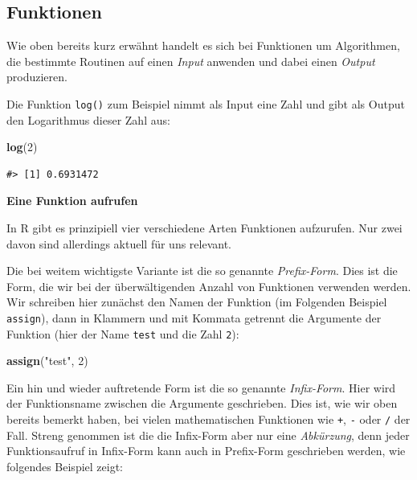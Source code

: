 \documentclass[]{tufte-book}
\newenvironment{Shaded}{}{}
\newcommand{\KeywordTok}[1]{\textcolor[rgb]{0.00,0.44,0.13}{\textbf{#1}}}
\newcommand{\DecValTok}[1]{\textcolor[rgb]{0.25,0.63,0.44}{#1}}
\newcommand{\StringTok}[1]{\textcolor[rgb]{0.25,0.44,0.63}{#1}}
\newcommand{\NormalTok}[1]{#1}
\begin{document}
\subsection{Funktionen}\label{funktionen}

Wie oben bereits kurz erwähnt handelt es sich bei Funktionen um
Algorithmen, die bestimmte Routinen auf einen \emph{Input} anwenden und
dabei einen \emph{Output} produzieren.

Die Funktion \texttt{log()} zum Beispiel nimmt als Input eine Zahl und
gibt als Output den Logarithmus dieser Zahl aus:

\begin{Shaded}
\begin{Highlighting}[]
\KeywordTok{log}\NormalTok{(}\DecValTok{2}\NormalTok{)}
\end{Highlighting}
\end{Shaded}

\begin{verbatim}
#> [1] 0.6931472
\end{verbatim}

\textbf{Eine Funktion aufrufen}

In R gibt es prinzipiell vier verschiedene Arten Funktionen aufzurufen.
Nur zwei davon sind allerdings aktuell für uns relevant.

Die bei weitem wichtigste Variante ist die so genannte
\emph{Prefix-Form}. Dies ist die Form, die wir bei der überwältigenden
Anzahl von Funktionen verwenden werden. Wir schreiben hier zunächst den
Namen der Funktion (im Folgenden Beispiel \texttt{assign}), dann in
Klammern und mit Kommata getrennt die Argumente der Funktion (hier der
Name \texttt{test} und die Zahl \texttt{2}):

\begin{Shaded}
\begin{Highlighting}[]
\KeywordTok{assign}\NormalTok{(}\StringTok{"test"}\NormalTok{, }\DecValTok{2}\NormalTok{)}
\end{Highlighting}
\end{Shaded}

Ein hin und wieder auftretende Form ist die so genannte
\emph{Infix-Form}. Hier wird der Funktionsname zwischen die Argumente
geschrieben. Dies ist, wie wir oben bereits bemerkt haben, bei vielen
mathematischen Funktionen wie \texttt{+}, \texttt{-} oder \texttt{/} der
Fall. Streng genommen ist die die Infix-Form aber nur eine
\emph{Abkürzung}, denn jeder Funktionsaufruf in Infix-Form kann auch in
Prefix-Form geschrieben werden, wie folgendes Beispiel zeigt:
\end{document}
